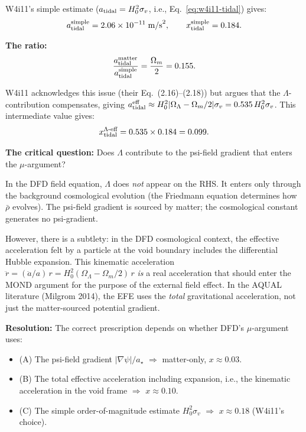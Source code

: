 \documentclass[11pt,a4paper]{article}
\newcounter{findingctr}
\newenvironment{finding}[1][]{%
  \refstepcounter{findingctr}%
  \begin{tcolorbox}[colback=blue!3!white, colframe=blue!50!black,
    title=\textbf{Finding \thefindingctr: #1}]
}{%
  \end{tcolorbox}%
}
\newcommand{\ee}[1]{\times 10^{#1}}
\newcommand{\Hzero}{H_0}
\newcommand{\astar}{a_\star}
\newcommand{\mufd}{\mu}
\newcommand{\Omm}{\Omega_m}
\newcommand{\OmL}{\Omega_\Lambda}
\begin{document}
\begin{finding}[\textbf{CRITICAL}: $\Omm$ Prefactor Ambiguity in $a_{\rm tidal}$]
W4i11's simple estimate ($a_{\rm tidal} = \Hzero^2\sigma_v$, i.e.,
Eq.~\eqref{eq:w4i11-tidal}) gives:
\begin{equation}
a_{\rm tidal}^{\rm simple} = 2.06\ee{-11}\;\text{m/s}^2,
\qquad x_{\rm tidal}^{\rm simple} = 0.184.
\end{equation}

\textbf{The ratio:}
\begin{equation}
\frac{a_{\rm tidal}^{\rm matter}}{a_{\rm tidal}^{\rm simple}}
= \frac{\Omm}{2} = 0.155.
\end{equation}

W4i11 acknowledges this issue (their Eq.~(2.16)--(2.18)) but argues
that the $\Lambda$-contribution compensates, giving
$a_{\rm tidal}^{\rm eff} \approx \Hzero^2|\OmL - \Omm/2|\sigma_v
= 0.535\,\Hzero^2\sigma_v$. This intermediate value gives:
\begin{equation}
x_{\rm tidal}^{\Lambda\text{-eff}} = 0.535 \times 0.184 = 0.099.
\end{equation}

\textbf{The critical question:} Does $\Lambda$ contribute to the
psi-field gradient that enters the $\mufd$-argument?

In the DFD field equation, $\Lambda$ does \emph{not} appear on
the RHS. It enters only through the background cosmological
evolution (the Friedmann equation determines how $\bar{\rho}$
evolves). The psi-field gradient is sourced by matter; the
cosmological constant generates no psi-gradient.

However, there is a subtlety: in the DFD cosmological context, the
effective acceleration felt by a particle at the void boundary
includes the differential Hubble expansion. This kinematic
acceleration $\ddot{r} = (\ddot{a}/a)\,r = \Hzero^2(\OmL - \Omm/2)\,r$
\emph{is} a real acceleration that should enter the MOND argument
for the purpose of the external field effect. In the AQUAL
literature (Milgrom 2014), the EFE uses the \emph{total}
gravitational acceleration, not just the matter-sourced potential
gradient.

\textbf{Resolution:} The correct prescription depends on whether
DFD's $\mufd$-argument uses:
\begin{itemize}[nosep]
\item (A) The psi-field gradient $|\nabla\psi|/\astar$
  $\Rightarrow$ matter-only, $x \approx 0.03$.
\item (B) The total effective acceleration including expansion,
  i.e., the kinematic acceleration in the void frame
  $\Rightarrow$ $x \approx 0.10$.
\item (C) The simple order-of-magnitude estimate $\Hzero^2\sigma_v$
  $\Rightarrow$ $x \approx 0.18$ (W4i11's choice).
\end{itemize}


\end{finding}
\end{document}
